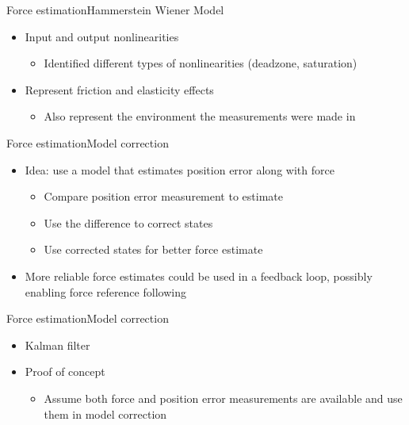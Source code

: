 \begin{frame}{Force estimation}{Hammerstein Wiener Model}
\begin{itemize}
  \item Input and output nonlinearities
  \begin{itemize}
    \item Identified different types of nonlinearities (deadzone, saturation)
  \end{itemize}  
  \item Represent friction and elasticity effects
  \begin{itemize}
  	\item Also represent the environment the measurements were made in
  \end{itemize}
\end{itemize}
\end{frame}



\begin{frame}{Force estimation}{Model correction}
\begin{itemize}
\item Idea: use a model that estimates position error along with force
\begin{itemize}
\item Compare position error measurement to estimate
\item Use the difference to correct states 
\item Use corrected states for better force estimate
\end{itemize}
\item More reliable force estimates could be used in a feedback loop, possibly enabling force reference following
\end{itemize}


\end{frame}

\begin{frame}{Force estimation}{Model correction}
\begin{itemize}
\item Kalman filter
\item Proof of concept
\begin{itemize}
\item Assume both force and position error measurements are available and use them in model correction
\end{itemize}
\end{itemize}
\end{frame}

